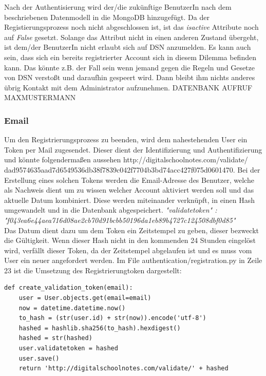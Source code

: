 Nach der Authentisierung wird der/die zukünftige BenutzerIn nach dem beschriebenen Datenmodell in die MongoDB hinzugefügt. Da der Registierungsprozess noch nicht abgeschlossen ist, ist das \textit{isactive} Attribute noch auf \textit{False} gesetzt.
Solange das Attribut nicht in einen anderen Zustand übergeht, ist dem/der BenutzerIn nicht erlaubt sich auf DSN anzumelden. Es kann auch sein, dass sich ein bereits registrierter Account sich in diesem Dilemma befinden kann. Das könnte z.B. der Fall sein wenn jemand gegen die Regeln und Gesetze von DSN verstoßt und daraufhin gespeert wird. Dann bleibt ihm nichts anderes übrig Kontakt mit dem Administrator aufzunehmen.  
DATENBANK AUFRUF MAXMUSTERMANN

\subsubsection{Email}
Um den Registrierungsprozess zu beenden, wird dem nahestehenden User ein Token per Mail zugesendet. Dieser dient der Identifizierung und Authentifizierung und könnte folgendermaßen aussehen http://digitalschoolnotes.com/validate/
\\dad9574635aad7d6549536db38f7839c042f7704b3bd74acc427f075d0601470. Bei der Erstellung eines solchen Tokens werden die Email-Adresse des Benutzer, welche als Nachweis dient um zu wissen welcher Account aktiviert werden soll und das aktuelle Datum kombiniert. Diese werden miteinander verknüpft, in einen Hash umgewandelt und in die Datenbank abgespeichert. \textit{"validatetoken" : 
\\"f043ea6e44aea716d08ae2cb70d91bcbb50196da1eb89b4727c124508dbf0d85"}\\
Das Datum dient dazu um dem Token ein Zeitstempel zu geben, dieser bezweckt die Gültigkeit. Wenn dieser Hash nicht in den kommenden 24 Stunden eingelöst wird, verfällt dieser Token, da der Zeitstempel abgelaufen ist und es muss vom User ein neuer angefordert werden. 
Im File authentication/registration.py in Zeile 23 ist die Umsetzung des Registrierungtoken dargestellt:
\begin{lstlisting}
def create_validation_token(email):
    user = User.objects.get(email=email)
    now = datetime.datetime.now()
    to_hash = (str(user.id) + str(now)).encode('utf-8')
    hashed = hashlib.sha256(to_hash).hexdigest()
    hashed = str(hashed)
    user.validatetoken = hashed
    user.save()
    return 'http://digitalschoolnotes.com/validate/' + hashed
\end{lstlisting}

